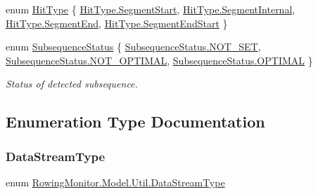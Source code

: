 \begin{DoxyCompactItemize}
enum \hyperlink{namespace_rowing_monitor_1_1_model_1_1_util_a7135d50f11f02e6f0cb9680dc68dba56}{Hit\+Type} \{ \hyperlink{namespace_rowing_monitor_1_1_model_1_1_util_a7135d50f11f02e6f0cb9680dc68dba56af1028e55b5ecef0c2dd53768ad212182}{Hit\+Type.\+Segment\+Start}, 
\hyperlink{namespace_rowing_monitor_1_1_model_1_1_util_a7135d50f11f02e6f0cb9680dc68dba56a9f45120e6ec846521e3b6b55e2dcc665}{Hit\+Type.\+Segment\+Internal}, 
\hyperlink{namespace_rowing_monitor_1_1_model_1_1_util_a7135d50f11f02e6f0cb9680dc68dba56aae19ae84ffd1b96e67e533a405e4cda7}{Hit\+Type.\+Segment\+End}, 
\hyperlink{namespace_rowing_monitor_1_1_model_1_1_util_a7135d50f11f02e6f0cb9680dc68dba56a1899bd0fcd7cf17807c2b09bacce7881}{Hit\+Type.\+Segment\+End\+Start}
 \}
\item 
enum \hyperlink{namespace_rowing_monitor_1_1_model_1_1_util_a248a257b884983ed79c45a8b34ee9580}{Subsequence\+Status} \{ \hyperlink{namespace_rowing_monitor_1_1_model_1_1_util_a248a257b884983ed79c45a8b34ee9580a1c250a21210b7b88a14db9a0cbe71162}{Subsequence\+Status.\+N\+O\+T\+\_\+\+S\+ET}, 
\hyperlink{namespace_rowing_monitor_1_1_model_1_1_util_a248a257b884983ed79c45a8b34ee9580a2a13cf4c2d798c8dd4b2c9622dad4a2d}{Subsequence\+Status.\+N\+O\+T\+\_\+\+O\+P\+T\+I\+M\+AL}, 
\hyperlink{namespace_rowing_monitor_1_1_model_1_1_util_a248a257b884983ed79c45a8b34ee9580af00c8dbdd6e1f11bdae06be94277d293}{Subsequence\+Status.\+O\+P\+T\+I\+M\+AL}
 \}\begin{DoxyCompactList}\small\item\em Status of detected subsequence. \end{DoxyCompactList}
\end{DoxyCompactItemize}


\subsection{Enumeration Type Documentation}
\mbox{\label{namespace_rowing_monitor_1_1_model_1_1_util_a01e1a06061533b246feb7421c9d0107f}} 
\subsubsection{\texorpdfstring{Data\+Stream\+Type}{DataStreamType}}
{\footnotesize\ttfamily enum \hyperlink{namespace_rowing_monitor_1_1_model_1_1_util_a01e1a06061533b246feb7421c9d0107f}{Rowing\+Monitor.\+Model.\+Util.\+Data\+Stream\+Type}\hspace{0.3cm}{\ttfamily [strong]}}

